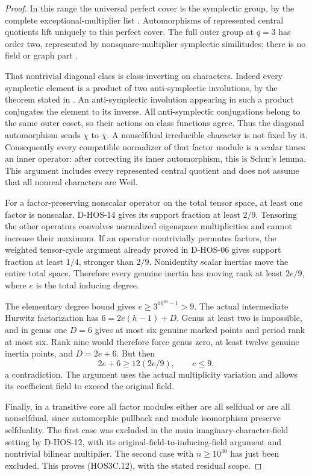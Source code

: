 \begin{proof}
In this range the universal perfect cover is the symplectic group,
by the complete exceptional-multiplier list
\cite[Chapter~5, Table~1 and preceding paragraph, p.~35]{BI:HHM}.
Automorphisms of represented central quotients lift uniquely to
this perfect cover. The full outer group at $q=3$ has order two,
represented by nonsquare-multiplier symplectic similitudes; there
is no field or graph part
\cite[\S2.2.2, Table~2.1, author p.~14]{HES:LiXia2022}.

That nontrivial diagonal class is class-inverting on characters.
Indeed every symplectic element is a product of two anti-symplectic
involutions, by the theorem stated in
\cite[Theorem~1, author p.~1]{HOS:Vinroot2004}.
An anti-symplectic involution appearing in such a product conjugates
the element to its inverse. All anti-symplectic conjugations belong
to the same outer coset, so their actions on class functions agree.
Thus the diagonal automorphism sends $\chi$ to $\overline\chi$.
A nonselfdual irreducible character is not fixed by it. Consequently
every compatible normalizer of that factor module is a scalar times
an inner operator: after correcting its inner automorphism, this
is Schur's lemma. This argument includes every represented central
quotient and does not assume that all nonreal characters are Weil.

For a factor-preserving nonscalar operator on the total tensor
space, at least one factor is nonscalar. D-HOS-14 gives its support
fraction at least $2/9$. Tensoring the other operators convolves
normalized eigenspace multiplicities and cannot increase their
maximum. If an operator nontrivially permutes factors, the weighted
tensor-cycle argument already proved in D-HOS-06 gives support
fraction at least $1/4$, stronger than $2/9$. Nonidentity scalar
inertias move the entire total space. Therefore every genuine
inertia has moving rank at least $2e/9$, where $e$ is the total
inducing degree.

The elementary degree bound gives $e\ge3^{10^{30}-1}>9$.
The actual intermediate Hurwitz factorization has
$6=2e(h-1)+D$. Genus at least two is impossible, and in genus one
$D=6$ gives at most six genuine marked points and period rank at
most six. Rank nine would therefore force genus zero, at least
twelve genuine inertia points, and $D=2e+6$. But then
\[
                    2e+6\ge12(2e/9),\qquad e\le9,
 \tag{HOS3C.13}
\]
a contradiction. The argument uses the actual multiplicity variation
and allows its coefficient field to exceed the original field.

Finally, in a transitive core all factor modules either are all
selfdual or are all nonselfdual, since automorphic pullback and
module isomorphism preserve selfduality. The first case was excluded
in the main imaginary-character-field setting by D-HOS-12, with
its original-field-to-inducing-field argument and nontrivial
bilinear multiplier. The second case with $n\ge10^{30}$ has just
been excluded. This proves (HOS3C.12), with the stated residual scope.
\end{proof}

